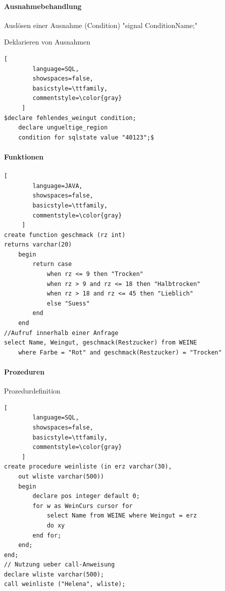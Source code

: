 \documentclass[a4paper]{article}
\begin{document}
\begin{multicols}{3}
    \paragraph{Ausnahmebehandlung}
    \begin{itemize*}
        \item Auslösen einer Ausnahme (Condition) "signal ConditionName;"
        \item Deklarieren von Ausnahmen
    \end{itemize*}
    \begin{lstlisting}[
        language=SQL,
        showspaces=false,
        basicstyle=\ttfamily,
        commentstyle=\color{gray}
     ]
$declare fehlendes_weingut condition;
    declare ungueltige_region
    condition for sqlstate value "40123";$
    \end{lstlisting}

    \paragraph{Funktionen}
    \begin{lstlisting}[
        language=JAVA,
        showspaces=false,
        basicstyle=\ttfamily,
        commentstyle=\color{gray}
     ]
create function geschmack (rz int)
returns varchar(20)
    begin
        return case
            when rz <= 9 then "Trocken"
            when rz > 9 and rz <= 18 then "Halbtrocken"
            when rz > 18 and rz <= 45 then "Lieblich"
            else "Suess"
        end
    end
//Aufruf innerhalb einer Anfrage
select Name, Weingut, geschmack(Restzucker) from WEINE
    where Farbe = "Rot" and geschmack(Restzucker) = "Trocken"
    \end{lstlisting}

    \paragraph{Prozeduren}
    Prozedurdefinition
    \begin{lstlisting}[
        language=SQL,
        showspaces=false,
        basicstyle=\ttfamily,
        commentstyle=\color{gray}
     ]
create procedure weinliste (in erz varchar(30),
    out wliste varchar(500))
    begin
        declare pos integer default 0;
        for w as WeinCurs cursor for
            select Name from WEINE where Weingut = erz
            do xy
        end for;
    end; 
end;
// Nutzung ueber call-Anweisung
declare wliste varchar(500);
call weinliste ("Helena", wliste);
    \end{lstlisting}


\end{multicols}
\end{document}
